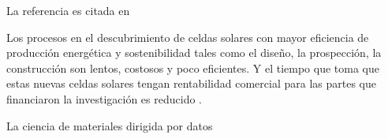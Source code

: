 La referencia es citada en \cite{wen2020}

Los procesos en el descubrimiento de celdas solares con mayor
eficiencia de producción energética y sostenibilidad tales como
el diseño, la prospección, la construcción son lentos, costosos y
poco eficientes. Y el tiempo que toma que estas nuevas celdas solares
tengan rentabilidad comercial para las partes que financiaron la investigación
es reducido \cite{eagar_bringing_1995}. 


La ciencia de materiales dirigida por datos 
